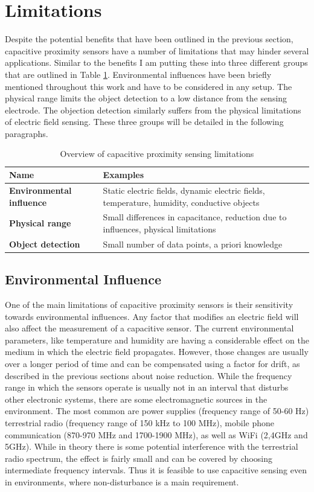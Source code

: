 \section{Limitations}
Despite the potential benefits that have been outlined in the previous section, capacitive proximity sensors have a number of limitations that may hinder several applications. 
Similar to the benefits I am putting these into three different groups that are outlined in Table \ref{tab:cap_limitations}. Environmental influences have been briefly mentioned throughout this work and have to be considered in any setup. The physical range limits the object detection to a low distance from the sensing electrode. The objection detection similarly suffers from the physical limitations of electric field sensing. These three groups will be detailed in the following paragraphs.

\begin{table}[htbp]
  \centering
  \caption{Overview of capacitive proximity sensing limitations}
    \begin{tabular}{p{4cm}p{6cm}}
    \toprule
    \textbf{Name} & \textbf{Examples} \\
    \midrule
    \textbf{Environmental influence} & Static electric fields, dynamic electric fields, temperature, humidity, conductive objects \\
    \textbf{Physical range} & Small differences in capacitance, reduction due to influences, physical limitations \\
    \textbf{Object detection} & Small number of data points, a priori knowledge \\
    \bottomrule
    \end{tabular}%
  \label{tab:cap_limitations}%
\end{table}%

\subsection{Environmental Influence}
One of the main limitations of capacitive proximity sensors is their sensitivity towards environmental influences. Any factor that modifies an electric field will also affect the measurement of a capacitive sensor. The current environmental parameters, like temperature and humidity are having a considerable effect on the medium in which the electric field propagates. However, those changes are usually over a longer period of time and can be compensated using a factor for drift, as described in the previous sections about noise reduction. While the frequency range in which the sensors operate is usually not in an interval that disturbs other electronic systems, there are some electromagnetic sources in the environment. The most common  are power supplies (frequency range of 50-60 Hz) terrestrial radio (frequency range of 150 kHz to 100 MHz), mobile phone communication (870-970 MHz and 1700-1900 MHz), as well as WiFi (2,4GHz and 5GHz). While in theory there is some potential interference with the terrestrial radio spectrum, the effect is fairly small and can be covered by choosing intermediate frequency intervals. Thus it is feasible to use capacitive sensing even in environments, where non-disturbance is a main requirement.

